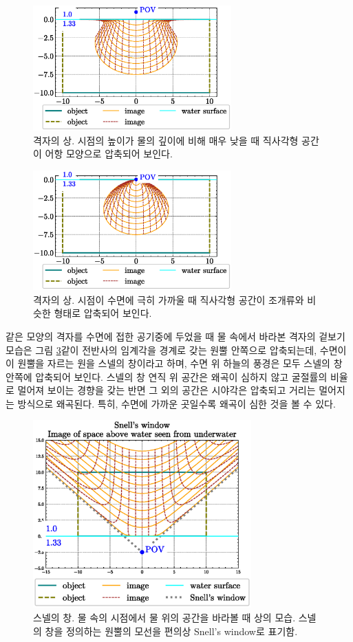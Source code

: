 \documentclass[twocolumn]{article}
\begin{document}
\begin{figure}
	\centering
	\includegraphics[width=3in]{figs/fishjar.eps}
	\caption{격자의 상. 시점의 높이가 물의 깊이에 비해 매우 낮을 때 직사각형 공간이 어항 모양으로 압축되어 보인다.}
	\label{fig:fishbowl}
\end{figure}

\begin{figure}
	\centering
	\includegraphics[width=3in]{figs/seashell_shape.eps}
	\caption{격자의 상.  시점이 수면에 극히 가까울 때 직사각형 공간이 조개류와 비슷한 형태로 압축되어 보인다.}
	\label{fig:seashell}
\end{figure}

같은 모양의 격자를 수면에 접한 공기중에 두었을 때 물 속에서 바라본 격자의 겉보기 모습은 그림 \ref{fig:snell_window}\과 같이 전반사의 임계각을 경계로 갖는 원뿔 안쪽으로 압축되는데, 수면이 이 원뿔을 자르는 원을 스넬의 창이라고 하며, 수면 위 하늘의 풍경은 모두 스넬의 창 안쪽에 압축되어 보인다. 스넬의 창 연직 위 공간은 왜곡이 심하지 않고 굴절률의 비율로 멀어져 보이는 경향을 갖는 반면 그 외의 공간은 시야각은 압축되고 거리는 멀어지는 방식으로 왜곡된다. 특히, 수면에 가까운 곳일수록 왜곡이 심한 것을 볼 수 있다.

\begin{figure}
	\centering
	\includegraphics[width=3.3in]{figs/snell_window.eps}
	\caption{스넬의 창. 물 속의 시점에서 물 위의 공간을 바라볼 때 상의 모습. 스넬의 창을 정의하는 원뿔의 모선을 편의상 Snell's window로 표기함.}
	\label{fig:snell_window}
\end{figure}
\end{document}
